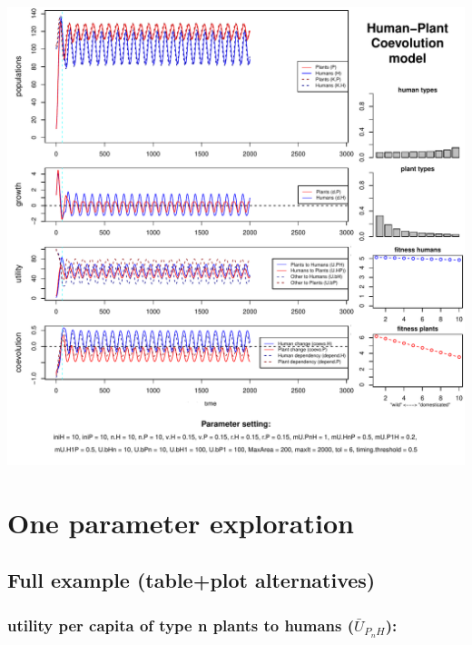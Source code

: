 \documentclass[
]{book}
\begin{document}
\includegraphics{hpcModel-exploration_files/figure-latex/1_run.semicoevo.osc2-plot-1.pdf}

\hypertarget{one-parameter-exploration}{%
\chapter{One parameter exploration}\label{one-parameter-exploration}}

\newpage

\hypertarget{full-example-tableplot-alternatives}{%
\section{Full example (table+plot alternatives)}\label{full-example-tableplot-alternatives}}

\hypertarget{utility-per-capita-of-type-n-plants-to-humans-baru_p_nh}{%
\subsection{\texorpdfstring{utility per capita \textbf{of} type n plants \textbf{to} humans (\(\bar{U}_{P_{n}H}\)):}{utility per capita of type n plants to humans (\textbackslash bar\{U\}\_\{P\_\{n\}H\}):}}\label{utility-per-capita-of-type-n-plants-to-humans-baru_p_nh}}
\end{document}
